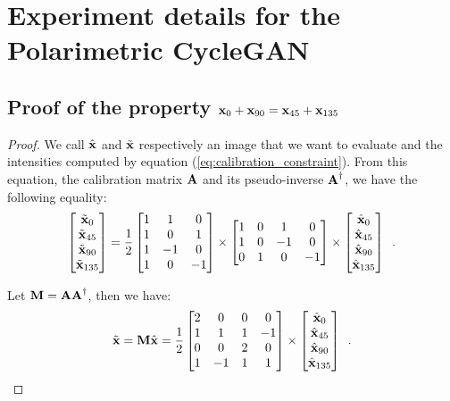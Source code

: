 \chapter{Experiment details for the Polarimetric CycleGAN}
\label{chap:details_eccv}

\section{Proof of the property $\textbf{x}_0 + \textbf{x}_{90} = \textbf{x}_{45} + \textbf{x}_{135}$}
\label{app:physical_prop}

\begin{proof}
	We call $\hat{\textbf{x}}$ and $\tilde{\textbf{x}}$ respectively an image that we want to evaluate and the intensities computed by equation (\ref{eq:calibration_constraint}). From this equation, the calibration matrix $\ma$ and its pseudo-inverse $\ma^\dagger$, we have the following equality:
	\begin{equation}
	\begin{bmatrix} 
		\tilde{\textbf{x}}_0 \\
		\tilde{\textbf{x}}_{45} \\	
		\tilde{\textbf{x}}_{90} \\
		\tilde{\textbf{x}}_{135} 
	\end{bmatrix} = \frac{1}{2}\begin{bmatrix}
		1 & 1 & 0 \\
		1 & 0 & 1 \\
		1 & -1 & 0 \\
		1 & 0 & -1
	\end{bmatrix}
	\times \begin{bmatrix}
		1 & 0 & 1 & 0 \\
		1 & 0 & -1 & 0 \\
		0 & 1 & 0 & -1
	\end{bmatrix} \times \begin{bmatrix} 
		\hat{\textbf{x}}_0 \\
		\hat{\textbf{x}}_{45} \\
		\hat{\textbf{x}}_{90} \\
		\hat{\textbf{x}}_{135}
	\end{bmatrix}\enspace.
	\label{eq:app_problem}
	\end{equation}

	Let $\mm = \ma\ma^\dagger$, then we have:
	$$
	\tilde{\vx} = \mm\hat{\vx} = \frac{1}{2}\begin{bmatrix}
		2 & 0 & 0 & 0 \\
		1 & 1 & 1 & -1 \\
		0 & 0 & 2 & 0 \\
		1 & -1 & 1 & 1
	\end{bmatrix} \times \begin{bmatrix} 
		\hat{\vx}_0 \\
		\hat{\vx}_{45} \\
		\hat{\vx}_{90} \\
		\hat{\vx}_{135}
	\end{bmatrix} \enspace.
	$$
	

\end{proof}
